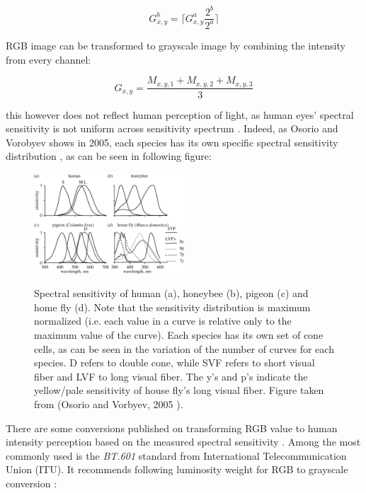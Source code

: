 \documentclass[pdftex,12pt,a4paper]{report}
\begin{document}
\begin{equation}
\label{equation:linear_conv_gray}
G^b_{x,y} = \lceil G^a_{x,y} \frac{2^b}{2^a} \rceil
\end{equation}

RGB image can be transformed to grayscale image by combining the intensity from every channel:

$$
G_{x, y} = \frac{M_{x, y, 1} + M_{x, y, 2} + M_{x, y, 3}}{3}
$$

this however does not reflect human perception of light, as human eyes' spectral sensitivity is not uniform across sensitivity spectrum \cite{wyszecki1982color}. Indeed, as Osorio and Vorobyev shows in 2005, each species has its own specific spectral sensitivity distribution \cite{osoosorio2005photoreceptor}, as can be seen in following figure:

\begin{figure}[H]
\centering
\includegraphics[width=0.5\textwidth]{images/spectral_sensitivity}
\label{fig:spectral_sensitivity}
\caption{Spectral sensitivity of human (a), honeybee (b), pigeon (c) and home fly (d). Note that the sensitivity distribution is maximum normalized (i.e. each value in a curve is relative only to the maximum value of the curve). Each species has its own set of cone cells, as can be seen in the variation of the number of curves for each species. D refers to double cone, while SVF refers to short visual fiber and LVF to long visual fiber. The y's and p's indicate the yellow/pale sensitivity of house fly's long visual fiber. Figure taken from (Osorio and Vorbyev, 2005 \cite{osorio2005photoreceptor}).}
\end{figure}

There are some conversions published on transforming RGB value to human intensity perception based on the measured spectral sensitivity \cite{anderson1996proposal, itu2007studio, itu2015parameter}. Among the most commonly used is the \textit{BT.601} standard from International Telecommunication Union (ITU). It recommends following luminosity weight for RGB to grayscale conversion \cite{itu2007studio}:
\end{document}
